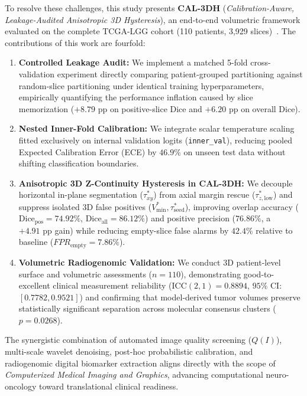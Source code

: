 \documentclass[preprint,12pt,authoryear]{elsarticle}
\begin{document}
To resolve these challenges, this study presents \textbf{CAL-3DH} (\textit{Calibration-Aware, Leakage-Audited Anisotropic 3D Hysteresis}), an end-to-end volumetric framework evaluated on the complete TCGA-LGG cohort (110 patients, 3,929 slices)~\citep{buda2019association}. The contributions of this work are fourfold:
\begin{enumerate}
    \item \textbf{Controlled Leakage Audit:} We implement a matched 5-fold cross-validation experiment directly comparing patient-grouped partitioning against random-slice partitioning under identical training hyperparameters, empirically quantifying the performance inflation caused by slice memorization ($+8.79\text{ pp}$ on positive-slice Dice and $+6.20\text{ pp}$ on overall Dice).
    \item \textbf{Nested Inner-Fold Calibration:} We integrate scalar temperature scaling fitted exclusively on internal validation logits (\texttt{inner\_val}), reducing pooled Expected Calibration Error (ECE) by $46.9\%$ on unseen test data without shifting classification boundaries.
    \item \textbf{Anisotropic 3D Z-Continuity Hysteresis in CAL-3DH:} We decouple horizontal in-plane segmentation ($\tau_{xy}^*$) from axial margin rescue ($\tau_{z,\mathrm{low}}^*$) and suppress isolated 3D false positives ($V_{\mathrm{min}}^*, \tau_{\mathrm{seed}}^*$), improving overlap accuracy ($\text{Dice}_{\text{pos}} = 74.92\%$, $\text{Dice}_{\text{all}} = 86.12\%$) and positive precision ($76.86\%$, a $+4.91\text{ pp}$ gain) while reducing empty-slice false alarms by $42.4\%$ relative to baseline ($FPR_{\mathrm{empty}} = 7.86\%$).
    \item \textbf{Volumetric Radiogenomic Validation:} We conduct 3D patient-level surface and volumetric assessments ($n=110$), demonstrating good-to-excellent clinical measurement reliability ($\text{ICC}(2, 1) = 0.8894$, $95\%$ CI: $[0.7782, 0.9521]$) and confirming that model-derived tumor volumes preserve statistically significant separation across molecular consensus clusters ($p = 0.0268$).
\end{enumerate}

The synergistic combination of automated image quality screening ($Q(I)$), multi-scale wavelet denoising, post-hoc probabilistic calibration, and radiogenomic digital biomarker extraction aligns directly with the scope of \textit{Computerized Medical Imaging and Graphics}, advancing computational neuro-oncology toward translational clinical readiness.
\end{document}
